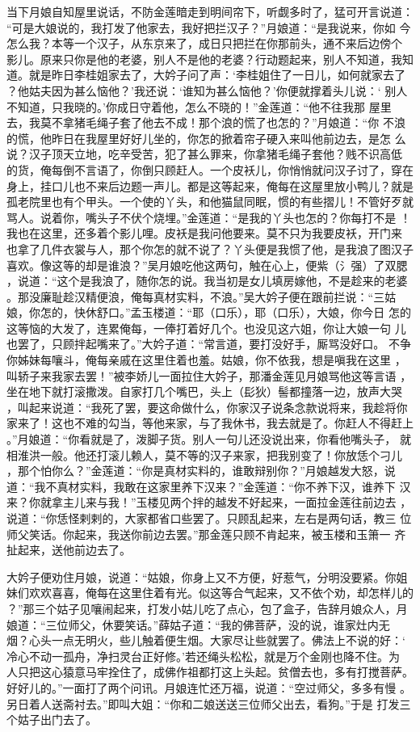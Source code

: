 当下月娘自知屋里说话，不防金莲暗走到明间帘下，听觑多时了，猛可开言说道：
“可是大娘说的，我打发了他家去，我好把拦汉子？”月娘道：“是我说来，你如
今怎么我？本等一个汉子，从东京来了，成日只把拦在你那前头，通不来后边傍个
影儿。原来只你是他的老婆，别人不是他的老婆？行动题起来，别人不知道，我知
道。就是昨日李桂姐家去了，大妗子问了声：‘李桂姐住了一日儿，如何就家去了
？他姑夫因为甚么恼他？’我还说：‘谁知为甚么恼他？’你便就撑着头儿说：‘
别人不知道，只我晓的。’你成日守着他，怎么不晓的！”金莲道：“他不往我那
屋里去，我莫不拿猪毛绳子套了他去不成！那个浪的慌了也怎的？”月娘道：“你
不浪的慌，他昨日在我屋里好好儿坐的，你怎的掀着帘子硬入来叫他前边去，是怎
么说？汉子顶天立地，吃辛受苦，犯了甚么罪来，你拿猪毛绳子套他？贱不识高低
的货，俺每倒不言语了，你倒只顾赶人。一个皮袄儿，你悄悄就问汉子讨了，穿在
身上，挂口儿也不来后边题一声儿。都是这等起来，俺每在这屋里放小鸭儿？就是
孤老院里也有个甲头。一个使的丫头，和他猫鼠同眠，惯的有些摺儿！不管好歹就
骂人。说着你，嘴头子不伏个烧埋。”金莲道：“是我的丫头也怎的？你每打不是
！我也在这里，还多着个影儿哩。皮袄是我问他要来。莫不只为我要皮袄，开门来
也拿了几件衣裳与人，那个你怎的就不说了？丫头便是我惯了他，是我浪了图汉子
喜欢。像这等的却是谁浪？”吴月娘吃他这两句，触在心上，便紫（氵强）了双腮
，说道：“这个是我浪了，随你怎的说。我当初是女儿填房嫁他，不是趁来的老婆
。那没廉耻趁汉精便浪，俺每真材实料，不浪。”吴大妗子便在跟前拦说：“三姑
娘，你怎的，快休舒口。”孟玉楼道：“耶（口乐），耶（口乐），大娘，你今日
怎的这等恼的大发了，连累俺每，一俸打着好几个。也没见这六姐，你让大娘一句
儿也罢了，只顾拌起嘴来了。”大妗子道：“常言道，要打没好手，厮骂没好口。
不争你姊妹每嚷斗，俺每亲戚在这里住着也羞。姑娘，你不依我，想是嗔我在这里
，叫轿子来我家去罢！”被李娇儿一面拉住大妗子，那潘金莲见月娘骂他这等言语
，坐在地下就打滚撒泼。自家打几个嘴巴，头上（髟狄）髻都撞落一边，放声大哭
，叫起来说道：“我死了罢，要这命做什么，你家汉子说条念款说将来，我趁将你
家来了！这也不难的勾当，等他来家，与了我休书，我去就是了。你赶人不得赶上
。”月娘道：“你看就是了，泼脚子货。别人一句儿还没说出来，你看他嘴头子，
就相淮洪一般。他还打滚儿赖人，莫不等的汉子来家，把我别变了！你放恁个刁儿
，那个怕你么？”金莲道：“你是真材实料的，谁敢辩别你？”月娘越发大怒，说
道：“我不真材实料，我敢在这家里养下汉来？”金莲道：“你不养下汉，谁养下
汉来？你就拿主儿来与我！”玉楼见两个拌的越发不好起来，一面拉金莲往前边去
，说道：“你恁怪剌剌的，大家都省口些罢了。只顾乱起来，左右是两句话，教三
位师父笑话。你起来，我送你前边去罢。”那金莲只顾不肯起来，被玉楼和玉箫一
齐扯起来，送他前边去了。

大妗子便劝住月娘，说道：“姑娘，你身上又不方便，好惹气，分明没要紧。你姐
妹们欢欢喜喜，俺每在这里住着有光。似这等合气起来，又不依个劝，却怎样儿的
？”那三个姑子见嚷闹起来，打发小姑儿吃了点心，包了盒子，告辞月娘众人，月
娘道：“三位师父，休要笑话。”薛姑子道：“我的佛菩萨，没的说，谁家灶内无
烟？心头一点无明火，些儿触着便生烟。大家尽让些就罢了。佛法上不说的好：‘
冷心不动一孤舟，净扫灵台正好修。’若还绳头松松，就是万个金刚也降不住。为
人只把这心猿意马牢拴住了，成佛作祖都打这上头起。贫僧去也，多有打搅菩萨。
好好儿的。”一面打了两个问讯。月娘连忙还万福，说道：“空过师父，多多有慢
。另日着人送斋衬去。”即叫大姐：“你和二娘送送三位师父出去，看狗。”于是
打发三个姑子出门去了。

